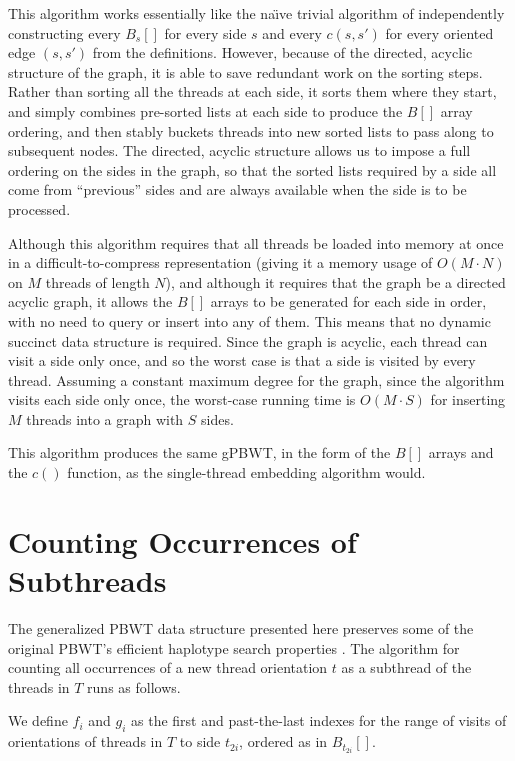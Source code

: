This algorithm works essentially like the na\"{\i}ve trivial algorithm of independently constructing every $B_s[]$ for every side $s$ and every $c(s, s')$ for every oriented edge $(s, s')$ from the definitions. However, because of the directed, acyclic structure of the graph, it is able to save redundant work on the sorting steps. Rather than sorting all the threads at each side, it sorts them where they start, and simply combines pre-sorted lists at each side to produce the $B[]$ array ordering, and then stably buckets threads into new sorted lists to pass along to subsequent nodes. The directed, acyclic structure allows us to impose a full ordering on the sides in the graph, so that the sorted lists required by a side all come from ``previous'' sides and are always available when the side is to be processed. 

Although this algorithm requires that all threads be loaded into memory at once in a difficult-to-compress representation (giving it a memory usage of $O(M \cdot N)$ on $M$ threads of length $N$), and although it requires that the graph be a directed acyclic graph, it allows the $B[]$ arrays to be generated for each side in order, with no need to query or insert into any of them. This means that no dynamic succinct data structure is required. Since the graph is acyclic, each thread can visit a side only once, and so the worst case is that a side is visited by every thread. Assuming a constant maximum degree for the graph, since the algorithm visits each side only once, the worst-case running time is $O(M \cdot S)$ for inserting $M$ threads into a graph with $S$ sides.

This algorithm produces the same gPBWT, in the form of the $B[]$ arrays and the $c()$ function, as the single-thread embedding algorithm would.

\section{Counting Occurrences of Subthreads}

The generalized PBWT data structure presented here preserves some of the original PBWT's efficient haplotype search properties \cite{durbin2014efficient}. The algorithm for counting all occurrences of a new thread orientation $t$ as a subthread of the threads in $T$ runs as follows.

We define $f_i$ and $g_i$ as the first and past-the-last indexes for the range of visits of orientations of threads in $T$ to side $t_{2i}$, ordered as in $B_{t_{2i}}[]$.

